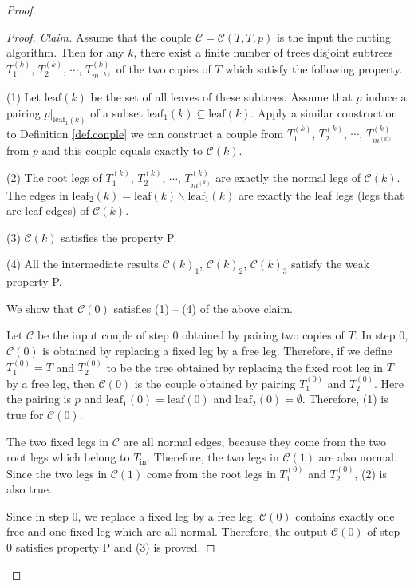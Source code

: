 \begin{proof}
\begin{proof}
\medskip

\textit{Claim.} Assume that the couple $\mathcal{C}=\mathcal{C}(T,T,p)$ is the input the cutting algorithm. Then for any $k$, there exist a finite number of trees disjoint subtrees $T^{(k)}_1$, $T^{(k)}_2$, $\cdots$, $T^{(k)}_{m^{(k)}}$ of the two copies of $T$ which satisfy the following property.

(1) Let $\text{leaf}(k)$ be the set of all leaves of these subtrees. Assume that $p$ induce a pairing $p|_{\text{leaf}_1(k)}$ of a subset $\text{leaf}_1(k)\subseteq\text{leaf}(k)$. Apply a similar construction to Definition \ref{def.conple} we can construct a couple from $T^{(k)}_1$, $T^{(k)}_2$, $\cdots$, $T^{(k)}_{m^{(k)}}$ from $p$ and this couple equals exactly to $\mathcal{C}(k)$.

(2) The root legs of $T^{(k)}_1$, $T^{(k)}_2$, $\cdots$, $T^{(k)}_{m^{(k)}}$ are exactly the normal legs of $\mathcal{C}(k)$. The edges in $\text{leaf}_2(k)=\text{leaf}(k)\backslash \text{leaf}_1(k)$ are exactly the leaf legs (legs that are leaf edges) of $\mathcal{C}(k)$.

(3) $\mathcal{C}(k)$ satisfies the property P.

(4) All the intermediate results  $\mathcal{C}(k)_1$, $\mathcal{C}(k)_2$, $\mathcal{C}(k)_3$ satisfy the weak property P.

\medskip

We show that $\mathcal{C}(0)$ satisfies (1) -- (4) of the above claim.

Let $\mathcal{C}$ be the input couple of step $0$ obtained by pairing two copies of $T$. In step $0$, $\mathcal{C}(0)$ is obtained by replacing a fixed leg by a free leg. Therefore, if we define $T^{(0)}_{1}=T$ and $T^{(0)}_{2}$ to be the tree obtained by replacing the fixed root leg in $T$ by a free leg, then $\mathcal{C}(0)$ is the couple obtained by pairing $T^{(0)}_{1}$ and $T^{(0)}_{2}$. Here the pairing is $p$ and $\text{leaf}_1(0)=\text{leaf}(0)$ and $\text{leaf}_2(0)=\emptyset$. Therefore, (1) is true for $\mathcal{C}(0)$.

The two fixed legs in $\mathcal{C}$ are all normal edges, because they come from the two root legs which belong to $T_{\text{in}}$. Therefore, the two legs in $\mathcal{C}(1)$ are also normal. Since the two legs in $\mathcal{C}(1)$ come from the root legs in $T^{(0)}_{1}$ and $T^{(0)}_{2}$, (2) is also true.

Since in step $0$, we replace a fixed leg by a free leg, $\mathcal{C}(0)$ contains exactly one free and one fixed leg which are all normal. Therefore, the output $\mathcal{C}(0)$ of step $0$ satisfies property P and (3) is proved.


\end{proof}
\end{proof}
